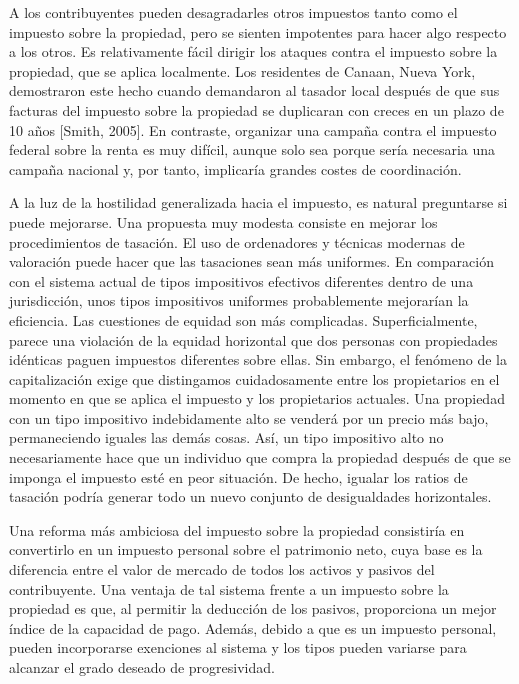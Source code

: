 \documentclass[10pt,a4paper]{article}
\begin{document}
A los contribuyentes pueden desagradarles otros impuestos tanto como el impuesto sobre la propiedad, pero se sienten impotentes para hacer algo respecto a los otros. Es relativamente fácil dirigir los ataques contra el impuesto sobre la propiedad, que se aplica localmente. Los residentes de Canaan, Nueva York, demostraron este hecho cuando demandaron al tasador local después de que sus facturas del impuesto sobre la propiedad se duplicaran con creces en un plazo de 10 años [Smith, 2005]. En contraste, organizar una campaña contra el impuesto federal sobre la renta es muy difícil, aunque solo sea porque sería necesaria una campaña nacional y, por tanto, implicaría grandes costes de coordinación.




A la luz de la hostilidad generalizada hacia el impuesto, es natural preguntarse si puede mejorarse. Una propuesta muy modesta consiste en mejorar los procedimientos de tasación. El uso de ordenadores y técnicas modernas de valoración puede hacer que las tasaciones sean más uniformes. En comparación con el sistema actual de tipos impositivos efectivos diferentes dentro de una jurisdicción, unos tipos impositivos uniformes probablemente mejorarían la eficiencia. Las cuestiones de equidad son más complicadas. Superficialmente, parece una violación de la equidad horizontal que dos personas con propiedades idénticas paguen impuestos diferentes sobre ellas. Sin embargo, el fenómeno de la capitalización exige que distingamos cuidadosamente entre los propietarios en el momento en que se aplica el impuesto y los propietarios actuales. Una propiedad con un tipo impositivo indebidamente alto se venderá por un precio más bajo, permaneciendo iguales las demás cosas. Así, un tipo impositivo alto no necesariamente hace que un individuo que compra la propiedad después de que se imponga el impuesto esté en peor situación. De hecho, igualar los ratios de tasación podría generar todo un nuevo conjunto de desigualdades horizontales.

Una reforma más ambiciosa del impuesto sobre la propiedad consistiría en convertirlo en un impuesto personal sobre el patrimonio neto, cuya base es la diferencia entre el valor de mercado de todos los activos y pasivos del contribuyente. Una ventaja de tal sistema frente a un impuesto sobre la propiedad es que, al permitir la deducción de los pasivos, proporciona un mejor índice de la capacidad de pago. Además, debido a que es un impuesto personal, pueden incorporarse exenciones al sistema y los tipos pueden variarse para alcanzar el grado deseado de progresividad.
\end{document}
